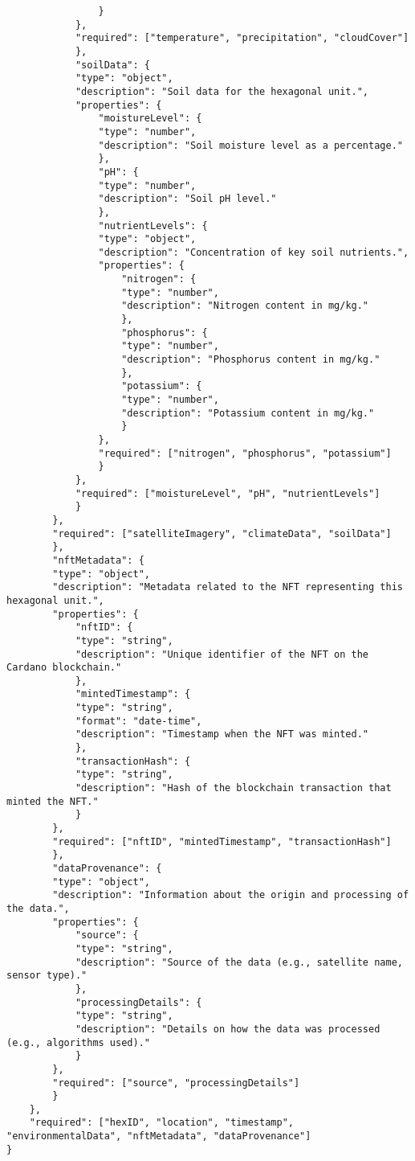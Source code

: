 \begin{verbatim}
                }
            },
            "required": ["temperature", "precipitation", "cloudCover"]
            },
            "soilData": {
            "type": "object",
            "description": "Soil data for the hexagonal unit.",
            "properties": {
                "moistureLevel": {
                "type": "number",
                "description": "Soil moisture level as a percentage."
                },
                "pH": {
                "type": "number",
                "description": "Soil pH level."
                },
                "nutrientLevels": {
                "type": "object",
                "description": "Concentration of key soil nutrients.",
                "properties": {
                    "nitrogen": {
                    "type": "number",
                    "description": "Nitrogen content in mg/kg."
                    },
                    "phosphorus": {
                    "type": "number",
                    "description": "Phosphorus content in mg/kg."
                    },
                    "potassium": {
                    "type": "number",
                    "description": "Potassium content in mg/kg."
                    }
                },
                "required": ["nitrogen", "phosphorus", "potassium"]
                }
            },
            "required": ["moistureLevel", "pH", "nutrientLevels"]
            }
        },
        "required": ["satelliteImagery", "climateData", "soilData"]
        },
        "nftMetadata": {
        "type": "object",
        "description": "Metadata related to the NFT representing this hexagonal unit.",
        "properties": {
            "nftID": {
            "type": "string",
            "description": "Unique identifier of the NFT on the Cardano blockchain."
            },
            "mintedTimestamp": {
            "type": "string",
            "format": "date-time",
            "description": "Timestamp when the NFT was minted."
            },
            "transactionHash": {
            "type": "string",
            "description": "Hash of the blockchain transaction that minted the NFT."
            }
        },
        "required": ["nftID", "mintedTimestamp", "transactionHash"]
        },
        "dataProvenance": {
        "type": "object",
        "description": "Information about the origin and processing of the data.",
        "properties": {
            "source": {
            "type": "string",
            "description": "Source of the data (e.g., satellite name, sensor type)."
            },
            "processingDetails": {
            "type": "string",
            "description": "Details on how the data was processed (e.g., algorithms used)."
            }
        },
        "required": ["source", "processingDetails"]
        }
    },
    "required": ["hexID", "location", "timestamp", "environmentalData", "nftMetadata", "dataProvenance"]
}
\end{verbatim}